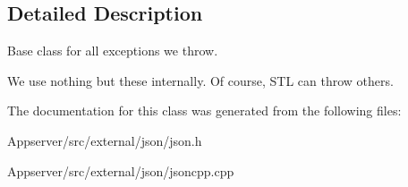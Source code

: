 \subsection{Detailed Description}
Base class for all exceptions we throw.

We use nothing but these internally. Of course, S\+TL can throw others. 

The documentation for this class was generated from the following files\+:\begin{DoxyCompactItemize}
\item 
Appserver/src/external/json/json.\+h\item 
Appserver/src/external/json/jsoncpp.\+cpp\end{DoxyCompactItemize}
